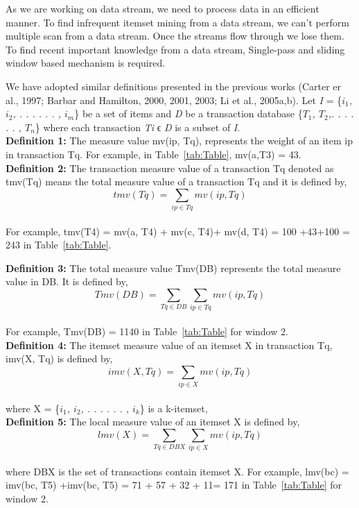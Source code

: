As we are working on data stream, we need to process data in an efficient manner. To find infrequent itemset mining from a data stream, we can’t perform multiple scan from a data stream. Once the streams flow  through we lose them. To find recent important knowledge from a data stream, Single-pass and sliding window based mechanism \cite{ahmed2008shrfp} is required. 

We have adopted similar definitions presented in the previous works (Carter er al., 1997; Barbar and Hamilton, 2000, 2001, 2003; Li et al., 2005a,b). Let {\it I} = \{{\it $i_1$, $i_2$, . . . . . . , $i_m$}\} be a set of items and {\it D} be a transaction database \{{\it $T_1$, $T_2$,. . . . . . , $T_n$}\} where each transaction {\it Ti} ϵ {\it D} is a subset of {\it I}.\\
\textbf{Definition 1:} The measure value mv(ip, Tq), represents the weight of an item ip in transaction Tq. For example, in Table~\ref{tab:Table}, mv(a,T3) = 43. \\
\textbf{Definition 2:} The transaction measure value of a transaction Tq denoted as tmv(Tq) means the total measure value of a transaction Tq and it is defined by, 
\begin{equation}
tmv (Tq) = \sum_{ip \in  Tq} mv(ip,Tq)
\end{equation}
\\ For example, tmv(T4) = mv(a, T4) + mv(c, T4)+ mv(d, T4) = 100 +43+100 = 243 in Table~\ref{tab:Table}.


\textbf{Definition 3:} The total measure value Tmv(DB) represents the total measure value in DB. It is defined by,
\begin{equation}
Tmv (DB) = \sum_{Tq \in DB}\sum_{ip \in  Tq} mv(ip,Tq)
\end{equation}
\\For example, Tmv(DB) = 1140 in Table~\ref{tab:Table} for window 2. \\

\textbf{Definition 4:} The itemset measure value of an itemset X in transaction Tq, imv(X, Tq) is defined by,
\begin{equation}
imv (X, Tq) = \sum_{ip \in X} mv(ip,Tq)
\end{equation}
\\where X = \{{\it $i_1$, $i_2$, . . . . . . , $i_k$}\} is a k-itemset,  %
\\
\textbf{Definition 5:} The local measure value of an itemset X is defined by, 
\begin{equation}
lmv (X) = \sum_{Tq \in DBX}\sum_{ip \in X} mv(ip,Tq)
\end{equation}
\\where DBX is the set of transactions contain itemset X. For example, lmv(bc) = imv(bc, T5) +imv(bc, T5) = 71 + 57 + 32 + 11= 171 in Table~\ref{tab:Table} for window 2. \\

